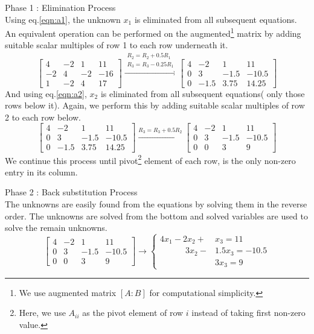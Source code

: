 \par Phase 1 : Elimination Process\\

Using eq.\ref{eqn:a1}, the unknown $x_1$ is eliminated from all subsequent equations. An equivalent operation can be performed on the augmented\footnote{We use augmented matrix $[A:B]$ for computational simplicity.} matrix by adding suitable scalar multiples of row 1 to each row underneath it.
\[ \begin{bmatrix} 4 & -2 & 1 & 11 \\ -2 & 4 & -2 & -16 \\ 1 & -2 & 4 & 17 \end{bmatrix} \xrightarrow{\substack{R_2 = R_2 + 0.5R_1\\ R_3 = R_3 - 0.25R_1}} \begin{bmatrix} 4 & -2 & 1 & 11 \\ 0 & 3 & -1.5 & -10.5 \\ 0 & -1.5 & 3.75 & 14.25 \end{bmatrix}\]
And using eq.\ref{eqn:a2}, $x_2$ is eliminated from all subsequent equations( only those rows below it). Again, we perform this by adding suitable scalar multiples of row 2 to each row below.
\[ \begin{bmatrix} 4 & -2 & 1 & 11 \\ 0 & 3 & -1.5 & -10.5 \\ 0 & -1.5 & 3.75 & 14.25 \end{bmatrix} \xrightarrow{R_3 = R_3 + 0.5R_2} \begin{bmatrix} 4 & -2 & 1 & 11 \\ 0 & 3 & -1.5 & -10.5 \\ 0 & 0 & 3 & 9 \end{bmatrix} \]
	We continue this process until pivot\footnote{Here, we use $A_{ii}$ as the pivot element of row $i$ instead of taking first non-zero value.} element of each row, is the only non-zero entry in its column.

\par Phase 2 : Back substitution Process\\

The unknowns are easily found from the equations by solving them in the reverse order. The unknowns are solved from the bottom and solved variables are used to solve the remain unknowns.
\[ \begin{bmatrix} 4 & -2 & 1 & 11 \\ 0 & 3 & -1.5 & -10.5 \\ 0 & 0 & 3 & 9 \end{bmatrix} \to \begin{cases} 4x_1 - 2x_2 + &x_3  = 11 \\ \quad \qquad 3x_2 - &1.5x_3  = -10.5 \\  &3x_3 = 9 \end{cases}  \]

